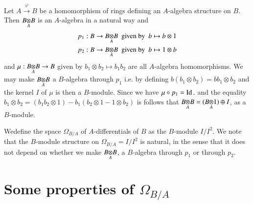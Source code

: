 Let $A\xrightarrow{\varphi}B$ be a homomorphism of rings defining an
$A$-algebra structure on $B$. Then $\foprod{B}{B}{A}$ is an $A$-algebra
in a natural way and
\begin{align*}
& p_{1}:B\to \foprod{B}{B}{A}\text{ \ given by \ } b\mapsto b\otimes 1\\
& p_{2}:B\to \foprod{B}{B}{A}\text{ \ given by \ } b\mapsto 1\otimes b
\end{align*}
and $\mu:\foprod{B}{B}{A}\to B$ given by $b_{1}\otimes b_{2}\mapsto
b_{1}b_{2}$ are all $A$-algebra homomorphisms. We may make
$\foprod{B}{B}{A}$ a $B$-algebra through $p_{1}$ i.e. by defining
$b(b_{1}\otimes b_{2})=bb_{1}\otimes b_{2}$ and the kernel $I$ of
$\mu$ is then a $B$-module. Since we have $\mu\circ p_{1}=\operatorname{Id}.$ and
the equality $b_{1}\otimes b_{2}=(b_{1}b_{2}\otimes
1)-b_{1}(b_{2}\otimes 1-1\otimes b_{2})$ is follows that
$\foprod{B}{B}{A}=(\foprod{B}{1}{A})\oplus I$, as a $B$-module.

We\pageoriginale define the space $\Omega_{B/A}$ of $A$-differentials
of $B$ as the $B$-module $I/I^{2}$. We note that the $B$-module
structure on $\Omega_{B/A}=I/I^{2}$ is natural, in the sense that it
does not depend on whether we make $\foprod{B}{B}{A}$, a $B$-algebra
through $p_{1}$ or through $p_{2}$.

\section*{Some properties of $\Omega_{B/A}$}

